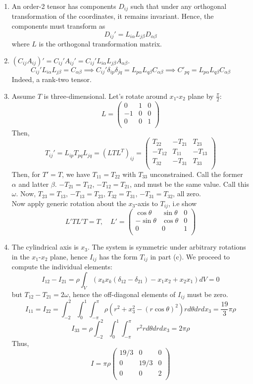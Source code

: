 \documentclass[a4paper]{article}
\begin{document}
\newpage
\begin{ans}\leavevmode
\begin{enumerate}[label=(\alph*)]
\item An order-2 tensor has components $D_{ij}$ such that under any orthogonal transformation of the coordinates, it remains invariant. Hence, the components must transform as
$$D_{ij}'=L_{i\alpha}L_{j\beta}D_{\alpha\beta}$$
where $L$ is the orthogonal transformation matrix.
\item $(C_{ij}A_{ij})'=C_{ij}'A_{ij}'=C_{ij}'L_{i\alpha}L_{j\beta}A_{\alpha\beta}$.
$$C_{ij}'L_{i\alpha}L_{j\beta}=C_{\alpha\beta}\implies C_{ij}'\delta_{ip}\delta_{jq}=L_{p\alpha}L_{q\beta}C_{\alpha\beta}\implies C'_{pq}=L_{p\alpha}L_{q\beta}C_{\alpha\beta}$$
Indeed, a rank-two tensor.
\item Assume $T$ is three-dimensional. Let's rotate around $x_1$-$x_2$ plane by $\frac{\pi}{2}$:
$$L=\begin{pmatrix}0&1&0\\-1&0&0\\0&0&1\\\end{pmatrix}$$
Then, 
$$T_{ij}'=L_{ip}T_{pq}L_{jq}=(LTL^T)_{ij}=\begin{pmatrix}T_{22}&-T_{21}&T_{23}\\-T_{12}&T_{11}&-T_{13}\\T_{32}&-T_{31}&T_{33}\\\end{pmatrix}$$
Then, for $T'=T$, we have $T_{11}=T_{22}$ with $T_{33}$ unconstrained. Call the former $\alpha$ and latter $\beta$. $-T_{21}=T_{12}$, $-T_{12}=T_{21}$, and must be the same value. Call this $\omega$. Now, $T_{23}=T_{13}$, $-T_{13}=T_{23}$, $T_{32}=T_{31}$, $-T_{31}=T_{32}$, all zero.\\[5pt]
Now apply generic rotation about the $x_3$-axis to $T_{ij}$, i.e show
$$L'TL'T=T,\quad L'=\begin{pmatrix}\cos\theta &\sin\theta&0\\-\sin\theta&\cos\theta&0\\0&0&1\\\end{pmatrix}$$
\item The cylindrical axis is $x_3$. The system is symmetric under arbitrary rotations in the $x_1$-$x_2$ plane, hence $I_{ij}$ has the form $T_{ij}$ in part (c). We proceed to compute the individual elements:
$$I_{12}-I_{21}=\rho\int_V(x_kx_k(\delta_{12}-\delta_{21})-x_1x_2+x_2x_1)dV=0$$
but $T_{12}-T_{21}=2\omega$, hence the off-diagonal elements of $I_{ij}$ must be zero.
$$I_{11}=I_{22}=\int_{-2}^2\int_0^1\int_{-\pi}^\pi\rho(r^2+x_3^2-(r\cos\theta)^2)r d\theta dr dx_3=\frac{19}{3}\pi\rho$$
$$I_{33}=\rho\int_{-2}^2\int_0^1\int_{-\pi}^\pi r^2rd\theta dr dx_3=2\pi\rho$$
Thus,
$$I=\pi\rho\begin{pmatrix}19/3&0&0\\0&19/3&0\\0&0&2\\\end{pmatrix}$$
\end{enumerate}
\end{ans}
\end{document}
